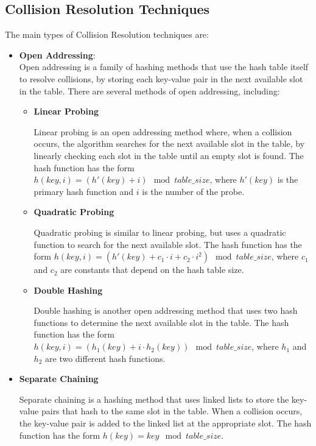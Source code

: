 \documentclass[11pt]{article}
\begin{document}
\subsection{Collision Resolution Techniques}

The main types of Collision Resolution techniques are: 
\begin{itemize}
    \item \textbf{Open Addressing}: \\
    Open addressing is a family of hashing methods that use the hash table itself to resolve collisions, by storing each key-value pair in the next available slot in the table. There are several methods of open addressing, including:

    \begin{itemize}
        \item \textbf{Linear Probing}
    
        Linear probing is an open addressing method where, when a collision occurs, the algorithm searches for the next available slot in the table, by linearly checking each slot in the table until an empty slot is found. The hash function has the form $h(key, i) = (h'(key) + i) \mod table\_size$, where $h'(key)$ is the primary hash function and $i$ is the number of the probe.
    
        \item \textbf{Quadratic Probing}
    
        Quadratic probing is similar to linear probing, but uses a quadratic function to search for the next available slot. The hash function has the form $h(key, i) = (h'(key) + c_1 \cdot i + c_2 \cdot i^2) \mod table\_size$, where $c_1$ and $c_2$ are constants that depend on the hash table size.
    
        \item \textbf{Double Hashing}
    
        Double hashing is another open addressing method that uses two hash functions to determine the next available slot in the table. The hash function has the form $h(key, i) = (h_1(key) + i \cdot h_2(key)) \mod table\_size$, where $h_1$ and $h_2$ are two different hash functions.
    
    \end{itemize}
    
    \item \textbf{Separate Chaining}
    
    Separate chaining is a hashing method that uses linked lists to store the key-value pairs that hash to the same slot in the table. When a collision occurs, the key-value pair is added to the linked list at the appropriate slot. The hash function has the form $h(key) = key \mod table\_size$.
    

\end{itemize}
\end{document}
